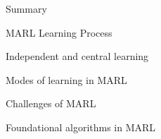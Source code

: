 \begin{frame}{Summary}

    \blist
        \item MARL Learning Process
        \item Independent and central learning
        \item Modes of learning in MARL
        \item Challenges of MARL
    \elist


    \blist
        \item Foundational algorithms in MARL
    \elist
    
\end{frame}



